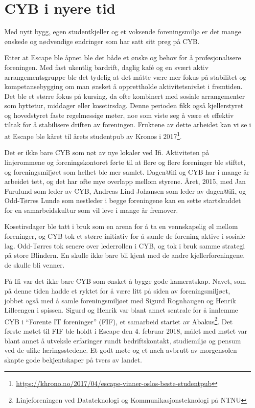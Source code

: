\chapter{CYB i nyere tid}

\author{Skrevet av Andreas Nyborg Hansen, med hjelp fra Thor Høgås, Odd-Tørres Lunde og Jan Furulund}

Med nytt bygg, egen studentkjeller og et voksende foreningsmiljø er det mange ønskede og nødvendige endringer som har satt sitt preg på CYB.

Etter at Escape ble åpnet ble det både et ønske og behov for å profesjonalisere foreningen. Med fast ukentlig bardrift, daglig kafé og en svært aktiv arrangementsgruppe ble det tydelig at det måtte være mer fokus på stabilitet og kompetansebygging om man ønsket å opprettholde aktivitetsnivået i fremtiden. Det ble et større fokus på kursing, da ofte kombinert med sosiale arrangementer som hyttetur, middager eller kosetirsdag. Denne perioden fikk også kjellerstyret og hovedstyret faste regelmessige møter, noe som viste seg å være et effektiv tiltak for å stabilisere driften av foreningen. Fruktene av dette arbeidet kan vi se i at Escape ble kåret til årets studentpub av Kronos i 2017\footnote{\url{https://khrono.no/2017/04/escape-vinner-oslos-beste-studentpub}}.

Det er ikke bare CYB som nøt av nye lokaler ved Ifi. Aktiviteten på linjerommene og foreningskontoret førte til at flere og flere foreninger ble stiftet, og foreningsmiljøet som helhet ble mer samlet. Dagen@ifi og CYB har i mange år arbeidet tett, og det har ofte mye overlapp mellom styrene. Året, 2015, med Jan Furulund som leder av CYB, Andreas Lind Johansen som leder av dagen@ifi, og Odd-Tørres Lunde som nestleder i begge foreningene kan en sette startskuddet for en samarbeidskultur som vil leve i mange år fremover. 

Kosetirsdager ble tatt i bruk som en arena for å ta en vennskapelig øl mellom foreninger, og CYB tok et større initiativ for å samle de forening aktive i sosiale lag. Odd-Tørres tok senere over lederrollen i CYB, og tok i bruk samme strategi på store Blindern. En skulle ikke bare bli kjent med de andre kjellerforeningene, de skulle bli venner.  

På Ifi var det ikke bare CYB som ønsket å bygge gode kameratskap. Navet, som på denne tiden hadde et ryktet for å være litt på siden av foreningsmiljøet, jobbet også med å samle foreningsmiljøet med Sigurd Rognhaugen og Henrik Lilleengen i spissen.  Sigurd og Henrik var blant annet sentrale for å innlemme CYB i ``Forente IT foreninger'' (FIF), et samarbeid startet av Abakus\footnote{Linjeforeningen ved Datateknologi og Kommunikasjonsteknologi på NTNU}. Det første møtet til FIF ble holdt i Escape den 4. februar 2018, målet med møtet var blant annet å utveksle erfaringer rundt bedriftskontakt, studiemiljø og pensum ved de ulike læringsstedene. Et godt møte og et nach avbrutt av morgensolen skapte gode bekjentskaper på tvers av landet. 


